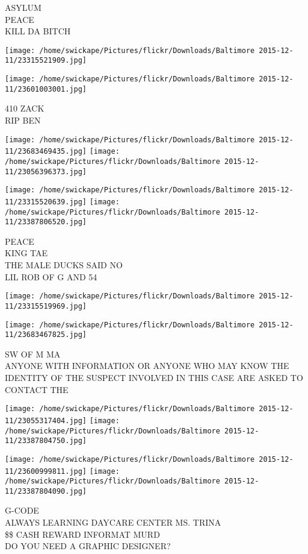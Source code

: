 \documentclass[10pt,letterpaper]{article}
\begin{document}
ASYLUM\\
PEACE\\
KILL DA BITCH
\pagebreak

\texttt{[image: /home/swickape/Pictures/flickr/Downloads/Baltimore 2015-12-11/23315521909.jpg]}

\vspace{0.25in}
\texttt{[image: /home/swickape/Pictures/flickr/Downloads/Baltimore 2015-12-11/23601003001.jpg]}

410 ZACK\\
RIP BEN
\pagebreak

\texttt{[image: /home/swickape/Pictures/flickr/Downloads/Baltimore 2015-12-11/23683469435.jpg]}
\texttt{[image: /home/swickape/Pictures/flickr/Downloads/Baltimore 2015-12-11/23056396373.jpg]}

\texttt{[image: /home/swickape/Pictures/flickr/Downloads/Baltimore 2015-12-11/23315520639.jpg]}
\texttt{[image: /home/swickape/Pictures/flickr/Downloads/Baltimore 2015-12-11/23387806520.jpg]}

PEACE\\
KING TAE\\
THE MALE DUCKS SAID NO\\
LIL ROB OF G AND 54
\pagebreak

\texttt{[image: /home/swickape/Pictures/flickr/Downloads/Baltimore 2015-12-11/23315519969.jpg]}

\vspace{0.25in}
\texttt{[image: /home/swickape/Pictures/flickr/Downloads/Baltimore 2015-12-11/23683467825.jpg]}

SW OF M MA\\
ANYONE WITH INFORMATION OR ANYONE WHO MAY KNOW THE IDENTITY OF THE SUSPECT INVOLVED IN THIS CASE ARE ASKED TO CONTACT THE
\pagebreak

\texttt{[image: /home/swickape/Pictures/flickr/Downloads/Baltimore 2015-12-11/23055317404.jpg]}
\texttt{[image: /home/swickape/Pictures/flickr/Downloads/Baltimore 2015-12-11/23387804750.jpg]}

\texttt{[image: /home/swickape/Pictures/flickr/Downloads/Baltimore 2015-12-11/23600999811.jpg]}
\texttt{[image: /home/swickape/Pictures/flickr/Downloads/Baltimore 2015-12-11/23387804090.jpg]}

G{-}CODE\\
ALWAYS LEARNING DAYCARE CENTER MS. TRINA\\
\$\$ CASH REWARD INFORMAT MURD\\
DO YOU NEED A GRAPHIC DESIGNER?
\pagebreak
\end{document}
